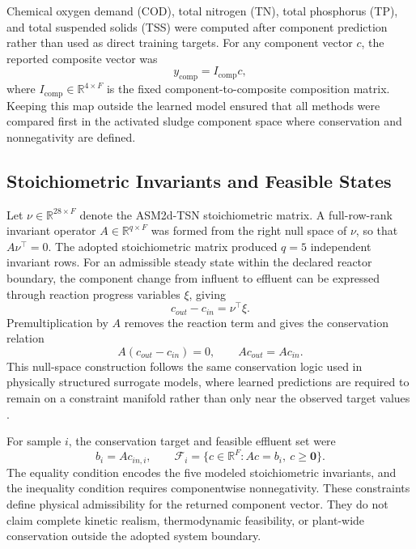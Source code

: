 \documentclass[12pt, twoside]{book}
\begin{document}
Chemical oxygen demand (COD), total nitrogen (TN), total phosphorus (TP), and total suspended solids (TSS)
were computed after component prediction rather than used as direct training targets. For any component vector
\(c\), the reported composite vector was
\begin{equation}
\label{eq:ch3_composite_map}
y_{\mathrm{comp}}=I_{\mathrm{comp}}c,
\end{equation}
where \(I_{\mathrm{comp}}\in\mathbb{R}^{4\times F}\) is the fixed component-to-composite composition matrix.
Keeping this map outside the learned model ensured that all methods were compared first in the activated
sludge component space where conservation and nonnegativity are defined.

\subsection{Stoichiometric Invariants and Feasible States}

Let \(\nu\in\mathbb{R}^{28\times F}\) denote the ASM2d-TSN stoichiometric matrix. A full-row-rank invariant
operator \(A\in\mathbb{R}^{q\times F}\) was formed from the right null space of \(\nu\), so that
\(A\nu^\top=0\). The adopted stoichiometric matrix produced \(q=5\) independent invariant rows. For an
admissible steady state within the declared reactor boundary, the component change from influent to effluent
can be expressed through reaction progress variables \(\xi\), giving
\begin{equation}
\label{eq:ch3_stoichiometric_change}
c_{out}-c_{in}=\nu^\top\xi .
\end{equation}
Premultiplication by \(A\) removes the reaction term and gives the conservation relation
\begin{equation}
\label{eq:ch3_invariant_relation}
A(c_{out}-c_{in})=0,\qquad Ac_{out}=Ac_{in}.
\end{equation}
This null-space construction follows the same conservation logic used in physically structured surrogate
models, where learned predictions are required to remain on a constraint manifold rather than only near the
observed target values \citep{SturmWexler2020,SturmWexler2022}.

For sample \(i\), the conservation target and feasible effluent set were
\begin{equation}
\label{eq:ch3_feasible_set}
b_i=Ac_{in,i},\qquad
\mathcal{F}_i=\{c\in\mathbb{R}^{F}:Ac=b_i,\ c\geq\mathbf{0}\}.
\end{equation}
The equality condition encodes the five modeled stoichiometric invariants, and the inequality condition
requires componentwise nonnegativity. These constraints define physical admissibility for the returned
component vector. They do not claim complete kinetic realism, thermodynamic feasibility, or plant-wide
conservation outside the adopted system boundary.
\end{document}
